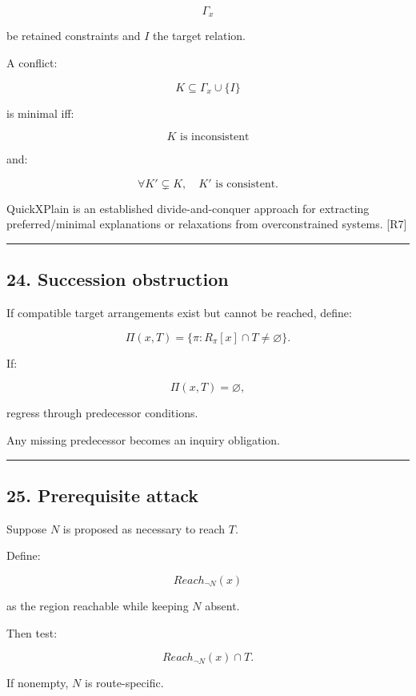 \documentclass[
]{article}
\begin{document}
\[
\Gamma_x
\]

be retained constraints and \(I\) the target relation.

A conflict:

\[
K\subseteq\Gamma_x\cup\{I\}
\]

is minimal iff:

\[
K\text{ is inconsistent}
\]

and:

\[
\forall K'\subsetneq K,\quad
K'\text{ is consistent}.
\]

QuickXPlain is an established divide-and-conquer approach for extracting
preferred/minimal explanations or relaxations from overconstrained
systems. {[}R7{]}

\begin{center}\rule{0.5\linewidth}{0.5pt}\end{center}

\subsection{24. Succession obstruction}\label{succession-obstruction}

If compatible target arrangements exist but cannot be reached, define:

\[
\Pi(x,T)
=
\{
\pi:
R_\pi[x]\cap T\neq\varnothing
\}.
\]

If:

\[
\Pi(x,T)=\varnothing,
\]

regress through predecessor conditions.

Any missing predecessor becomes an inquiry obligation.

\begin{center}\rule{0.5\linewidth}{0.5pt}\end{center}

\subsection{25. Prerequisite attack}\label{prerequisite-attack}

Suppose \(N\) is proposed as necessary to reach \(T\).

Define:

\[
Reach_{\neg N}(x)
\]

as the region reachable while keeping \(N\) absent.

Then test:

\[
\boxed{
Reach_{\neg N}(x)\cap T.
}
\]

If nonempty, \(N\) is route-specific.
\end{document}
